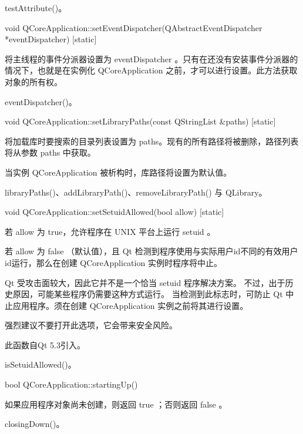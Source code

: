 \begin{notice}[另请参阅]
testAttribute()。
\end{notice}


void QCoreApplication::setEventDispatcher(QAbstractEventDispatcher *eventDispatcher) [static]

将主线程的事件分派器设置为 eventDispatcher 。只有在还没有安装事件分派器的情况下，也就是在实例化 QCoreApplication 之前，才可以进行设置。此方法获取对象的所有权。

\begin{notice}[另请参阅]
eventDispatcher()。
\end{notice}

void QCoreApplication::setLibraryPaths(const QStringList \&paths) [static]

将加载库时要搜索的目录列表设置为 paths。现有的所有路径将被删除，路径列表将从参数 paths 中获取。

当实例 QCoreApplication 被析构时，库路径将设置为默认值。

\begin{notice}[另请参阅]
libraryPaths()、addLibraryPath()、removeLibraryPath() 与 QLibrary。
\end{notice}

void QCoreApplication::setSetuidAllowed(bool allow) [static]

若 allow 为 true，允许程序在 UNIX 平台上运行 setuid 。

若 allow 为 false （默认值），且 Qt 检测到程序使用与实际用户id不同的有效用户id运行，那么在创建 QCoreApplication 实例时程序将中止。

Qt 受攻击面较大，因此它并不是一个恰当 setuid 程序解决方案。 不过，出于历史原因，可能某些程序仍需要这种方式运行。 当检测到此标志时，可防止 Qt 中止应用程序。须在创建 QCoreApplication 实例之前将其进行设置。



\begin{notice}
强烈建议不要打开此选项，它会带来安全风险。
\end{notice}

此函数自Qt 5.3引入。

\begin{notice}[另请参阅]
isSetuidAllowed()。
\end{notice}

bool QCoreApplication::startingUp()

如果应用程序对象尚未创建，则返回 true ；否则返回 false 。



\begin{notice}[另请参阅]
closingDown()。
\end{notice}

